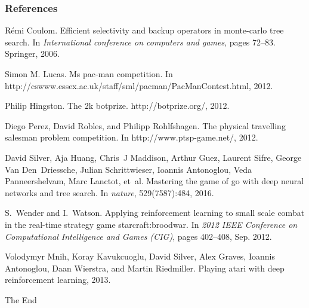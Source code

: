 \documentclass{beamer}
\begin{document}


\begin{frame}[allowframebreaks]
\frametitle{References}
\footnotesize{
\begin{thebibliography}{99} %
    R{\'e}mi Coulom.
    \newblock Efficient selectivity and backup operators in monte-carlo tree search.
    \newblock In {\em International conference on computers and games}, pages 72--83. Springer, 2006.

    Simon M. Lucas. 
    \newblock Ms pac-man competition. 
    \newblock In http://cswww.essex.ac.uk/staff/sml/pacman/PacManContest.html, 2012.

    Philip Hingston.
    \newblock The 2k botprize.
    \newblock http://botprize.org/, 2012.

    Diego Perez, David Robles, and Philipp Rohlfshagen. 
    \newblock The physical travelling salesman problem competition. 
    \newblock In http://www.ptsp-game.net/, 2012. 
    
    David Silver, Aja Huang, Chris~J Maddison, Arthur Guez, Laurent Sifre, George Van Den~Driessche, Julian Schrittwieser, Ioannis Antonoglou, Veda Panneershelvam, Marc Lanctot, et~al.
    \newblock Mastering the game of go with deep neural networks and tree search.
    \newblock In {\em nature}, 529(7587):484, 2016.

    S.~{Wender} and I.~{Watson}.
    \newblock Applying reinforcement learning to small scale combat in the real-time strategy game starcraft:broodwar.
    \newblock In {\em 2012 IEEE Conference on Computational Intelligence and Games (CIG)}, pages 402--408, Sep. 2012.

    Volodymyr Mnih, Koray Kavukcuoglu, David Silver, Alex Graves, Ioannis Antonoglou, Daan Wierstra, and Martin Riedmiller.
    \newblock Playing atari with deep reinforcement learning, 2013.
    \end{thebibliography}
}
\end{frame}


\begin{frame}
\Huge{\centerline{The End}}
\end{frame}

\end{document}
